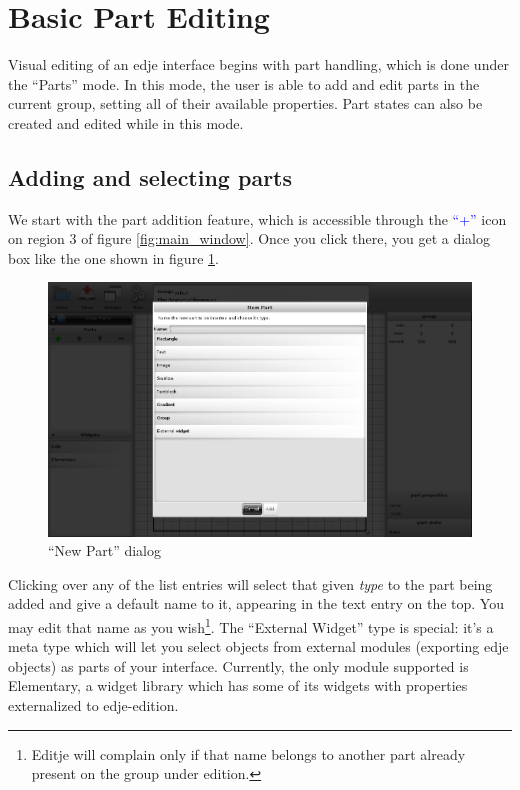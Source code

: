 \documentclass[a4paper]{profusion}
\newcommand{\GUIIcon}[1]{\textcolor{blue}{#1}}    %
\begin{document}
\section{Basic Part Editing}
\label{sec:part_editing}

Visual editing of an edje interface begins with part handling, which
is done under the ``Parts'' mode. In this mode, the user is able to
add and edit parts in the current group, setting all of their
available properties. Part states can also be created and edited while
in this mode.

\subsection{Adding and selecting parts}

 We start with the part addition feature, which is accessible through
 the \GUIIcon{``+''} icon on region 3 of figure
 \ref{fig:main_window}. Once you click there, you get a dialog box
 like the one shown in figure \ref{fig:add_part_box}.

\begin{figure}[h!]
  \centering
  \includegraphics[width=1.0\textwidth]{images/add_part.png}
  \caption{``New Part'' dialog}
  \label{fig:add_part_box}
\end{figure}

Clicking over any of the list entries will select that given
\emph{type} to the part being added and give a default name to it,
appearing in the text entry on the top. You may edit that name as you
wish\footnote{Editje will complain only if that name belongs to
  another part already present on the group under edition.}. The
``External Widget'' type is special: it's a meta type which will let
you select objects from external modules (exporting edje objects) as
parts of your interface. Currently, the only module supported is
Elementary, a widget library which has some of its widgets with
properties externalized to edje-edition.
\end{document}

